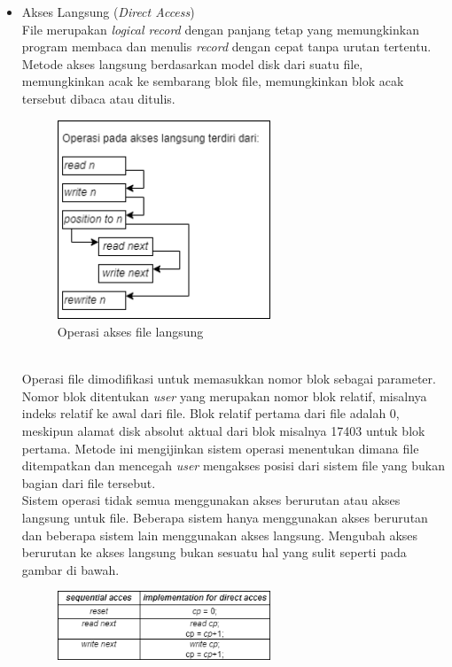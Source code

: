 \documentclass[12pt]{article}
\begin{document}
\begin{itemize}
\begin{itemize}
\begin{enumerate}
            \end{enumerate}
        \end{itemize}
    \item Akses Langsung (\textit{Direct Access})
        \\File merupakan \textit{logical record} dengan panjang tetap yang memungkinkan program membaca dan menulis \textit{record} dengan cepat tanpa urutan tertentu. Metode akses langsung berdasarkan model disk dari suatu file, memungkinkan acak ke sembarang blok file, memungkinkan blok acak tersebut dibaca atau ditulis.
        \begin{figure}[h]
			\centering
			\includegraphics[width=0.6\textwidth]{asset/gambar3.png}
            \caption{Operasi akses file langsung}
        \end{figure}
        \\Operasi file dimodifikasi untuk memasukkan nomor blok sebagai parameter. Nomor blok ditentukan \textit{user} yang merupakan nomor blok relatif, misalnya indeks relatif ke awal dari file. Blok relatif pertama dari file adalah 0, meskipun alamat disk absolut aktual dari blok misalnya 17403 untuk blok pertama. Metode ini mengijinkan sistem operasi menentukan dimana file ditempatkan dan mencegah \textit{user} mengakses posisi dari sistem file yang bukan bagian dari file tersebut. 
        \\Sistem operasi tidak semua menggunakan akses berurutan atau akses langsung untuk file. Beberapa sistem hanya menggunakan akses berurutan dan beberapa sistem lain menggunakan akses langsung. Mengubah akses berurutan ke akses langsung bukan sesuatu hal yang sulit seperti pada gambar di bawah.
        \begin{figure}[h]
			\centering
			\includegraphics[width=0.6\textwidth]{asset/gambar4.png}

\end{figure}
\end{itemize}
\end{document}
